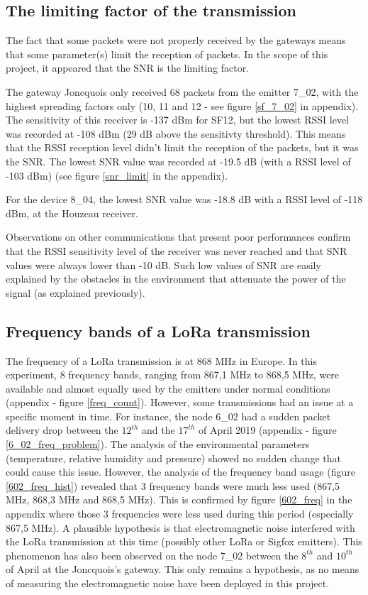 \documentclass[letterpaper, 10 pt, conference]{ieeeconf}  %
\begin{document}
\subsection{The limiting factor of the transmission}

The fact that some packets were not properly received by the gateways means that some parameter(s) limit the reception of packets. In the scope of this project, it appeared that the SNR is the limiting factor.

The gateway Joncquois only received 68 packets from the emitter 7\_02, with the highest spreading factors only (10, 11 and 12 - see figure \ref{sf_7_02} in appendix). The sensitivity of this receiver is -137 dBm for SF12, but the lowest RSSI level was recorded at -108 dBm (29 dB above the sensitivty threshold). This means that the RSSI reception level didn't limit the reception of the packets, but it was the SNR. The lowest SNR value was recorded at -19.5 dB (with a RSSI level of -103 dBm) (see figure \ref{snr_limit} in the appendix).

For the device 8\_04, the lowest SNR value was -18.8 dB with a RSSI level of -118 dBm, at the Houzeau receiver.

Observations on other communications that present poor performances confirm that the RSSI sensitivity level of the receiver was never reached and that SNR values were always lower than -10 dB. Such low values of SNR are easily explained by the obstacles in the environment that attenuate the power of the signal (as explained previously).

\subsection{Frequency bands of a LoRa transmission}

The frequency of a LoRa transmission is at 868 MHz in Europe. In this experiment, 8 frequency bands, ranging from 867,1 MHz to 868,5 MHz, were available and almost equally used by the emitters under normal conditions (appendix - figure \ref{freq_count}). However, some transmissions had an issue at a specific moment in time. For instance, the node 6\_02 had a sudden packet delivery drop between the $12^{th}$ and the $17^{th}$ of April 2019 (appendix - figure \ref{6_02_freq_problem}). The analysis of the environmental parameters (temperature, relative humidity and pressure) showed no sudden change that could cause this issue. However, the analysis of the frequency band usage (figure \ref{602_freq_hist}) revealed that 3 frequency bands were much less used (867,5 MHz, 868,3 MHz and 868,5 MHz). This is confirmed by figure \ref{602_freq} in the appendix where those 3 frequencies were less used during this period (especially 867,5 MHz). A plausible hypothesis is that electromagnetic noise interfered with the LoRa transmission at this time (possibly other LoRa or Sigfox emitters). This phenomenon has also been observed on the node 7\_02 between the $8^{th}$ and $10^{th}$ of April at the Joncquois's gateway. This only remains a hypothesis, as no means of measuring the electromagnetic noise have been deployed in this project.
\end{document}
